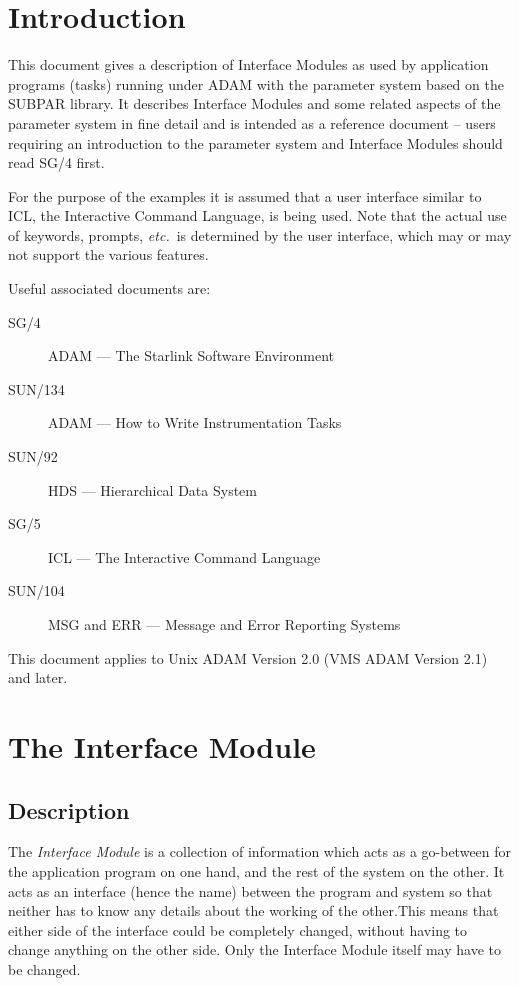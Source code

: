 \newpage
  \setlength{\parskip}{0mm}
  \tableofcontents
  \setlength{\parskip}{\medskipamount}
  \markright{\stardocname}

\section{Introduction}
This document gives a description of Interface Modules as used by
application programs (tasks) running under ADAM with the parameter system
based on the SUBPAR library.
It describes Interface Modules and some related aspects of the parameter 
system in fine detail and is intended as a reference document -- 
users requiring an introduction to the parameter system and Interface Modules 
should read SG/4 first.

For the purpose of the examples it is assumed that a user interface
similar to ICL, the Interactive Command Language, is being used.
Note that the actual use of keywords, prompts, {\em etc.}\ is 
determined by the user interface, which may or may not support the
various features. 

Useful associated documents are:
\begin{description}
\item[SG/4] ADAM --- The Starlink Software Environment
\item[SUN/134] ADAM --- How to Write Instrumentation Tasks
\item[SUN/92] HDS --- Hierarchical Data System
\item[SG/5] ICL --- The Interactive Command Language
\item[SUN/104] MSG and ERR --- Message and Error Reporting Systems
\end{description}
This document applies to Unix ADAM Version 2.0 (VMS ADAM Version 2.1) and 
later.

\section{The Interface Module}
\subsection{Description}
The {\em Interface Module}\/ is a collection of information which acts as a
go-between for the application program on one hand, and the rest of the
system on the other. It acts as an interface (hence the name) between
the program and system so that neither has to know any details about
the working of the other.This means that either
side of the interface could be completely changed, without having to
change anything on the other side.
Only the Interface Module itself may have to be changed. 


